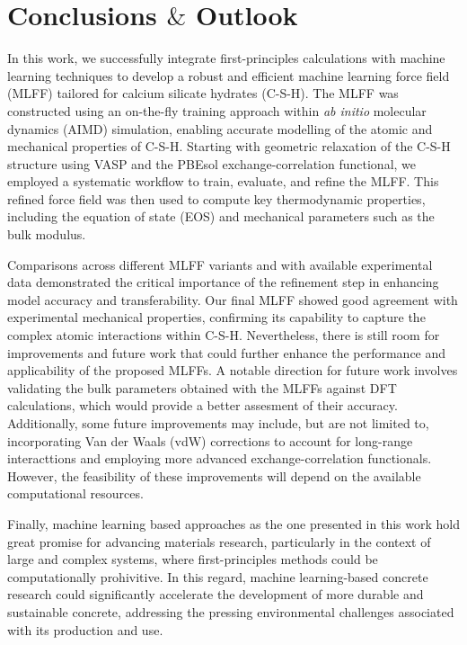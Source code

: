 \chapter{\texorpdfstring{Conclusions $\&$ Outlook}{Conclusions \& Outlook}} %

\label{Chapter5} %

In this work, we successfully integrate first-principles calculations with machine learning techniques to develop a robust and efficient machine learning force field (MLFF) tailored for calcium silicate hydrates (C-S-H). The MLFF was constructed using an on-the-fly training approach within \emph{ab initio} molecular dynamics (AIMD) simulation, enabling accurate modelling of the atomic and mechanical properties of C-S-H. Starting with geometric relaxation of the C-S-H structure using VASP and the PBEsol exchange-correlation functional, we employed a systematic workflow to train, evaluate, and refine the MLFF. This refined force field was then used to compute key thermodynamic properties, including the equation of state (EOS) and mechanical parameters such as the bulk modulus.

Comparisons across different MLFF variants and with available experimental data demonstrated the critical importance of the refinement step in enhancing model accuracy and transferability.
Our final MLFF showed good agreement with experimental mechanical properties, confirming its capability to capture the complex atomic interactions within C-S-H. Nevertheless, there is still room for improvements and future work that could further enhance the performance and applicability of the proposed MLFFs. A notable direction for future work involves validating the bulk parameters obtained with the MLFFs against DFT calculations, which would provide a better assesment of their accuracy. Additionally, some future improvements may include, but are not limited to, incorporating Van der Waals (vdW) corrections to account for long-range interacttions and employing more advanced exchange-correlation functionals. However, the feasibility of these improvements will depend on the available computational resources.

Finally, machine learning based approaches as the one presented in this work hold great promise for advancing materials research, particularly in the context of large and complex systems, where first-principles methods could be computationally prohivitive. In this regard, machine learning-based concrete research could significantly accelerate the development of more durable and sustainable concrete, addressing the pressing environmental challenges associated with its production and use.
